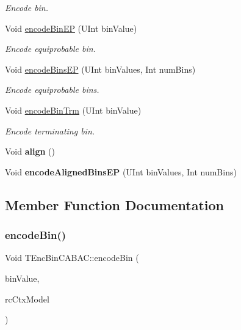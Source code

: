 \begin{DoxyCompactItemize}
\begin{DoxyCompactList}\small\item\em Encode bin. \end{DoxyCompactList}\item 
Void \hyperlink{class_t_enc_bin_c_a_b_a_c_abdd3bfd3c0afb0e39035204ad44116fa}{encode\+Bin\+EP} (U\+Int bin\+Value)
\begin{DoxyCompactList}\small\item\em Encode equiprobable bin. \end{DoxyCompactList}\item 
Void \hyperlink{class_t_enc_bin_c_a_b_a_c_ac33859a9a70a2e1c3b7ee15898f59b62}{encode\+Bins\+EP} (U\+Int bin\+Values, Int num\+Bins)
\begin{DoxyCompactList}\small\item\em Encode equiprobable bins. \end{DoxyCompactList}\item 
Void \hyperlink{class_t_enc_bin_c_a_b_a_c_adcb0c8eb4976f33cbafe2e90004bdbae}{encode\+Bin\+Trm} (U\+Int bin\+Value)
\begin{DoxyCompactList}\small\item\em Encode terminating bin. \end{DoxyCompactList}\item 
\mbox{\label{class_t_enc_bin_c_a_b_a_c_afe262f9113aff0c9e5c1de175b98f3a0}} 
Void {\bfseries align} ()
\item 
\mbox{\label{class_t_enc_bin_c_a_b_a_c_a7ac3e405b229106ce708beae09bb6611}} 
Void {\bfseries encode\+Aligned\+Bins\+EP} (U\+Int bin\+Values, Int num\+Bins)
\end{DoxyCompactItemize}


\subsection{Member Function Documentation}
\mbox{\label{class_t_enc_bin_c_a_b_a_c_a9e5762c4608e50ce0352a97e2b3c1357}} 
\subsubsection{\texorpdfstring{encode\+Bin()}{encodeBin()}}
{\footnotesize\ttfamily Void T\+Enc\+Bin\+C\+A\+B\+A\+C\+::encode\+Bin (\begin{DoxyParamCaption}\item[{U\+Int}]{bin\+Value,  }\item[{\hyperlink{class_context_model}{Context\+Model} \&}]{rc\+Ctx\+Model }\end{DoxyParamCaption})\hspace{0.3cm}{\ttfamily [virtual]}}




